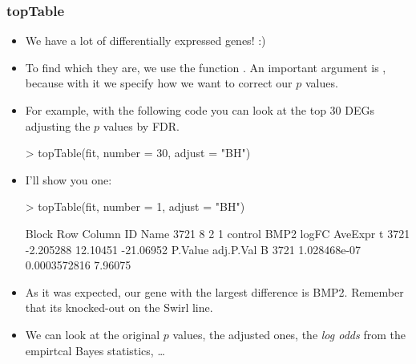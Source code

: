 \begin{frame}
  \frametitle{topTable}
  \begin{itemize}
  \item We have a lot of differentially expressed genes! :)
  \item To find which they are, we use the function . An important argument is , because with it we specify how we want to correct our $p$ values.
  \item For example, with the following code you can look at the top 30 DEGs adjusting the $p$ values by FDR.
\begin{Schunk}
\begin{Sinput}
> topTable(fit, number = 30, adjust = "BH")
\end{Sinput}
\end{Schunk}
  \item I'll show you one:
\begin{Schunk}
\begin{Sinput}
> topTable(fit, number = 1, adjust = "BH")
\end{Sinput}
\begin{Soutput}
     Block Row Column      ID Name
3721     8   2      1 control BMP2
         logFC  AveExpr         t
3721 -2.205288 12.10451 -21.06952
          P.Value    adj.P.Val       B
3721 1.028468e-07 0.0003572816 7.96075
\end{Soutput}
\end{Schunk}
  \item As it was expected, our gene with the largest difference is BMP2. Remember that its knocked-out on the Swirl line.
  \item We can look at the original $p$ values, the adjusted ones, the \emph{log odds} from the empirtcal Bayes statistics, \ldots
  \end{itemize}
\end{frame}

